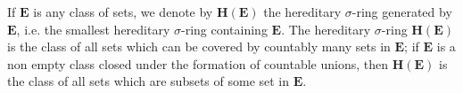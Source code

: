If $\mathbf{E}$ is any class of sets, we denote by $\mathbf{H}(\mathbf{E})$ the hereditary $\sigma$-ring generated by $\mathbf{E}$, i.e. the smallest hereditary $\sigma$-ring containing $\mathbf{E}$. The hereditary $\sigma$-ring $\mathbf{H}(\mathbf{E})$ is the class of all sets which can be covered by countably many sets in $\mathbf{E}$; if $\mathbf{E}$ is a non empty class closed under the formation of countable unions, then $\mathbf{H}(\mathbf{E})$ is the class of all sets which are subsets of some set in $\mathbf{E}$.

